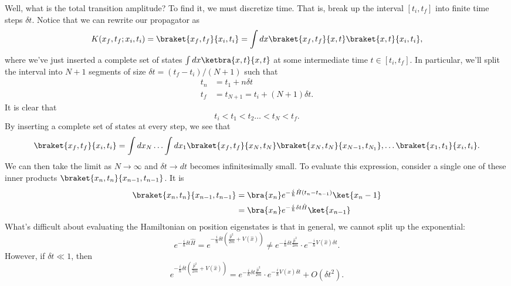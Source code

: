 Well, what is the total transition amplitude? To find it, we must discretize time. That is, break up the interval $[t_i,t_f]$ into finite time steps $\delta t$. Notice that we can rewrite our propagator as
\begin{equation}
    K(x_f,t_f; x_i, t_i) = \braket{x_f, t_f}{x_i,t_i} = \int dx \braket{x_f,t_f}{x,t} \braket{x,t}{x_i,t_i},
\end{equation}
where we've just inserted a complete set of states $\int dx \ketbra{x,t}{x,t}$ at some intermediate time $t\in [t_i,t_f]$. In particular, we'll split the interval into $N+1$ segments of size $\delta t= (t_f-t_i)/(N+1)$ such that
\begin{align}
    t_n &= t_1 +n\delta t\\
    t_f &= t_{N+1} = t_i + (N+1)\delta t.
\end{align}
It is clear that
\begin{equation}
    t_i < t_1 < t_2 \ldots < t_N < t_f.
\end{equation}
By inserting a complete set of states at every step, we see that
\begin{equation}
    \braket{x_f,t_f}{x_i,t_i} =\int dx_N \ldots \int dx_1 \braket{x_f,t_f}{x_N,t_N} \braket{x_N,t_N}{x_{N-1},t_{N_1}},\ldots \braket{x_1,t_1}{x_i,t_i}.
\end{equation}
We can then take the limit as $N\to \infty$ and $\delta t \to dt$ becomes infinitesimally small. To evaluate this expression, consider a single one of these inner products $\braket{x_n,t_n} {x_{n-1},t_{n-1}}$. It is
\begin{align}
    \braket{x_n,t_n} {x_{n-1},t_{n-1}} &= \bra{x_n} e^{-\frac{i}{\hbar} \hat H(t_n-t_{n-1})} \ket{x_n-1}\\
        &= \bra{x_n} e^{-\frac{i}{\hbar} \delta t \hat H} \ket{x_{n-1}}
\end{align}
What's difficult about evaluating the Hamiltonian on position eigenstates is that in general, we cannot split up the exponential:
\begin{equation}
    e^{-\frac{i}{\hbar} \delta t \hat H} = e^{-\frac{i}{\hbar}\delta t( \frac{\hat p^2}{2m} + V(\hat x))} \neq e^{-\frac{i}{\hbar} \delta t \frac{\hat p^2}{2m}} \cdot e^{-\frac{i}{\hbar} V(\hat x) \delta t}.
\end{equation}
However, if $\delta t \ll 1$, then
\begin{equation}
    e^{-\frac{i}{\hbar}\delta t( \frac{\hat p^2}{2m} + V(\hat x))} = e^{-\frac{i}{\hbar} \delta t \frac{\hat p^2}{2m}} \cdot e^{-\frac{i}{\hbar} V(\hat x) \delta t} + O(\delta t^2).
\end{equation}
